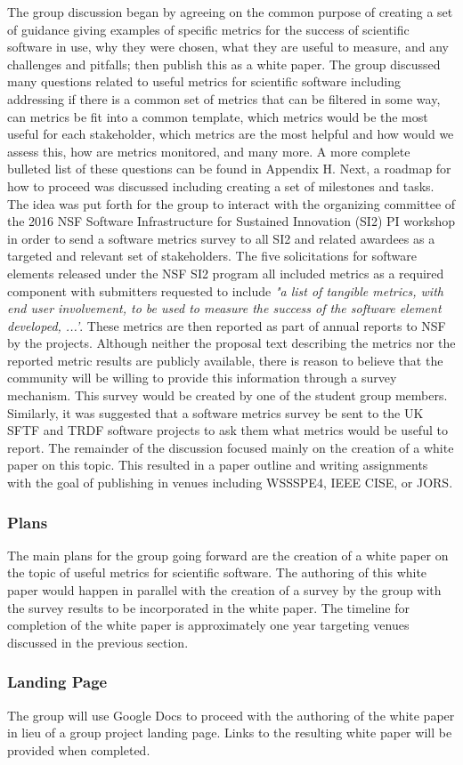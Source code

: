 The group discussion began by agreeing on the common purpose of creating a set of guidance giving examples of specific metrics for the success of scientific 
software in use, why they were chosen, what they are useful to measure, and any challenges and pitfalls; then publish this as a white paper. 
 The group discussed many questions related to useful metrics for scientific software including addressing if there is a common set of metrics that 
 can be filtered in some way, can metrics be fit into a common template, which metrics would be the most useful for each stakeholder, 
 which metrics are the most helpful and how would we assess this, how are metrics monitored, and many more.  
 A more complete bulleted list of these questions can be found in Appendix H.  Next, a roadmap for how to proceed was discussed including
 creating a set of milestones and tasks.  The idea was put forth for the group to interact with the organizing committee of the 2016 NSF Software Infrastructure
  for Sustained Innovation (SI2) PI workshop in order to send a software metrics survey to all SI2 and related awardees as a targeted and relevant set of stakeholders.  
 The five solicitations for software elements released  under the NSF SI2 program all included metrics as a required component with submitters requested to include 
 {\it "a list of tangible metrics, with end user involvement, to be used to measure the success of the software element developed, ...'}. These metrics are then reported as part of annual reports to NSF by the projects. Although neither the proposal text describing the metrics nor the reported metric results are publicly available, there is reason to believe that the community will be willing to provide this information through a survey mechanism. 
This survey would be created by one of the student group members.  Similarly, it was suggested that a software metrics survey be sent to the 
UK SFTF and TRDF software projects to ask them what metrics would be useful to report.  The remainder of the discussion focused mainly on the 
creation of a white paper on this topic.  This resulted in a paper outline and writing assignments with the goal of publishing in venues including 
WSSSPE4, IEEE CISE, or JORS.

\subsubsection{Plans}

The main plans for the group going forward are the creation of a white paper on the topic of useful metrics for scientific software.  The authoring of this white paper would happen in parallel with the creation of a survey by the group with the survey results to be incorporated in the white paper.  The timeline for completion of the white paper is approximately one year targeting venues discussed in the previous section.

\subsubsection{Landing Page}

The group will use Google Docs to proceed with the authoring of the white paper in lieu of a group project landing page.  Links to the resulting white paper will be provided when completed.
